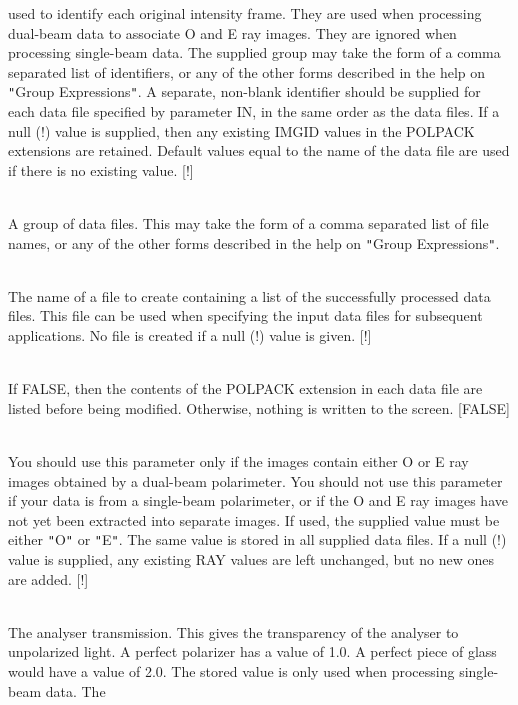 \documentclass[twoside,11pt]{article}
\renewcommand{\_}{\texttt{\symbol{95}}}
\newcommand{\sstsubsection}[1]{ \item[{#1}] \mbox{} \\}
\newcommand{\sstsubsection}[1]{\item[{#1}]}
\begin{document}
{{{         used to identify each original intensity frame. They are used
         when processing dual-beam data to associate O and E ray images.
         They are ignored when processing single-beam data. The supplied
         group may take the form of a comma separated list of identifiers,
         or any of the other forms described in the help on {\tt "}Group
         Expressions{\tt "}. A separate, non-blank identifier should be
         supplied for each data file specified by parameter IN, in the
         same order as the data files. If a null (!) value is supplied,
         then any existing IMGID values in the POLPACK extensions are
         retained. Default values equal to the name of the data file are
         used if there is no existing value. [!]
      }
      \sstsubsection{
         IN = LITERAL (Read)
      }{
         A group of data files. This may take the form of a comma separated
         list of file names, or any of the other forms described in the help
         on {\tt "}Group Expressions{\tt "}.
      }
      \sstsubsection{
         NAMELIST = LITERAL (Read)
      }{
         The name of a file to create containing a list of the successfully
         processed data files. This file can be used when specifying the input
         data files for subsequent applications. No file is created if a null
         (!) value is given. [!]
      }
      \sstsubsection{
         QUIET = \_LOGICAL (Read)
      }{
         If FALSE, then the contents of the POLPACK extension in each data
         file are listed before being modified. Otherwise, nothing is written
         to the screen. [FALSE]
      }
      \sstsubsection{
         RAY = LITERAL (Read)
      }{
         You should use this parameter only if the images contain either O
         or E ray images obtained by a dual-beam polarimeter. You should
         not use this parameter if your data is from a single-beam
         polarimeter, or if the O and E ray images have not yet been
         extracted into separate images. If used, the supplied value must
         be either {\tt "}O{\tt "} or {\tt "}E{\tt "}. The same value is stored in all supplied
         data files. If a null (!) value is supplied, any existing RAY
         values are left unchanged, but no new ones are added. [!]
      }
      \sstsubsection{
         T = \_REAL (Read)
      }{
         The analyser transmission. This gives the transparency of the
         analyser to unpolarized light. A perfect polarizer has a value of
         1.0. A perfect piece of glass would have a value of 2.0. The
         stored value is only used when processing single-beam data. The
}}}
\end{document}
